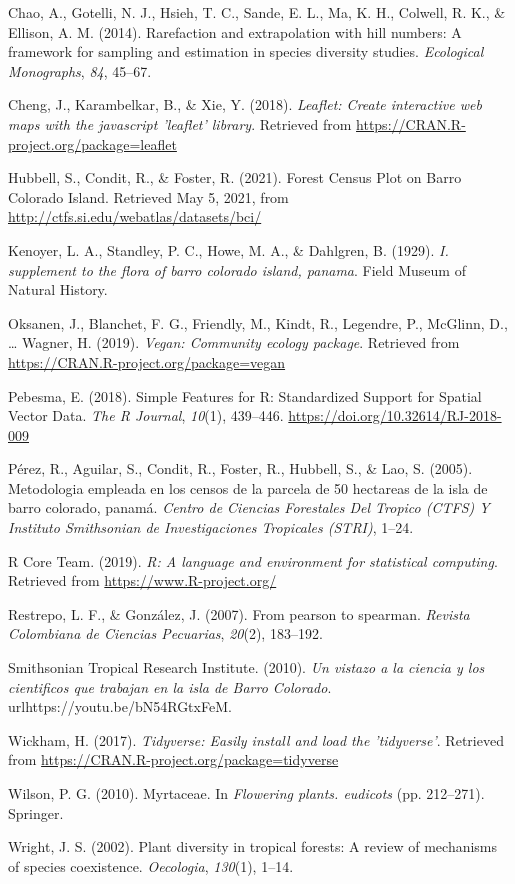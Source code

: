 \documentclass[11pt,]{article}
\begin{document}
\hypertarget{ref-paqueteiNEXT}{}
Chao, A., Gotelli, N. J., Hsieh, T. C., Sande, E. L., Ma, K. H.,
Colwell, R. K., \& Ellison, A. M. (2014). Rarefaction and extrapolation
with hill numbers: A framework for sampling and estimation in species
diversity studies. \emph{Ecological Monographs}, \emph{84}, 45--67.

\hypertarget{ref-leaflet}{}
Cheng, J., Karambelkar, B., \& Xie, Y. (2018). \emph{Leaflet: Create
interactive web maps with the javascript 'leaflet' library}. Retrieved
from \url{https://CRAN.R-project.org/package=leaflet}

\hypertarget{ref-webcenso}{}
Hubbell, S., Condit, R., \& Foster, R. (2021). Forest Census Plot on
Barro Colorado Island. Retrieved May 5, 2021, from
\url{http://ctfs.si.edu/webatlas/datasets/bci/}

\hypertarget{ref-kenoyer1929supplement}{}
Kenoyer, L. A., Standley, P. C., Howe, M. A., \& Dahlgren, B. (1929).
\emph{I. supplement to the flora of barro colorado island, panama}.
Field Museum of Natural History.

\hypertarget{ref-vegan}{}
Oksanen, J., Blanchet, F. G., Friendly, M., Kindt, R., Legendre, P.,
McGlinn, D., \ldots{} Wagner, H. (2019). \emph{Vegan: Community ecology
package}. Retrieved from \url{https://CRAN.R-project.org/package=vegan}

\hypertarget{ref-sf}{}
Pebesma, E. (2018). Simple Features for R: Standardized Support for
Spatial Vector Data. \emph{The R Journal}, \emph{10}(1), 439--446.
\url{https://doi.org/10.32614/RJ-2018-009}

\hypertarget{ref-perez2005metodologia}{}
Pérez, R., Aguilar, S., Condit, R., Foster, R., Hubbell, S., \& Lao, S.
(2005). Metodologia empleada en los censos de la parcela de 50 hectareas
de la isla de barro colorado, panamá. \emph{Centro de Ciencias
Forestales Del Tropico (CTFS) Y Instituto Smithsonian de Investigaciones
Tropicales (STRI)}, 1--24.

\hypertarget{ref-citadeR}{}
R Core Team. (2019). \emph{R: A language and environment for statistical
computing}. Retrieved from \url{https://www.R-project.org/}

\hypertarget{ref-restrepo2007pearson}{}
Restrepo, L. F., \& González, J. (2007). From pearson to spearman.
\emph{Revista Colombiana de Ciencias Pecuarias}, \emph{20}(2), 183--192.

\hypertarget{ref-bci_video}{}
Smithsonian Tropical Research Institute. (2010). \emph{Un vistazo a la
ciencia y los cientificos que trabajan en la isla de Barro Colorado}.
urlhttps://youtu.be/bN54RGtxFeM.

\hypertarget{ref-tidyverse}{}
Wickham, H. (2017). \emph{Tidyverse: Easily install and load the
'tidyverse'}. Retrieved from
\url{https://CRAN.R-project.org/package=tidyverse}

\hypertarget{ref-wilson2010myrtaceae}{}
Wilson, P. G. (2010). Myrtaceae. In \emph{Flowering plants. eudicots}
(pp. 212--271). Springer.

\hypertarget{ref-wright2002plant}{}
Wright, J. S. (2002). Plant diversity in tropical forests: A review of
mechanisms of species coexistence. \emph{Oecologia}, \emph{130}(1),
1--14.




\newpage
\singlespacing 
\end{document}
